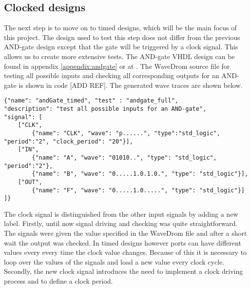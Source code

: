 \subsection{Clocked designs}
The next step is to move on to timed designs, which will be the main focus of this project. The design used to test this step does not differ from the previous AND-gate design except that the gate will be triggered by a clock signal. This allows us to create more extensive tests. The AND-gate VHDL design can be found in appendix \ref{appendix:andgate} or at \cite{examples}.
\npar
The WaveDrom source file for testing all possible inputs and checking all corresponding outputs for an AND-gate is shown in code [ADD REF]. The generated wave traces are shown below.
\begin{lstlisting}[style=json, caption={JSON source file for a full AND-gate test}, label={json:andgate_full}]
{"name": "andGate_timed", "test" : "andgate_full", 
"description": "test all possible inputs for an AND-gate", 
"signal": [
	["CLK",
		{"name": "CLK", "wave": "p......", "type":"std_logic", "period":"2", "clock_period": "20"}],
	["IN",
		{"name": "A", "wave": "01010..", "type": "std_logic", "period":"2"},
		{"name": "B", "wave": "0.....1.0.1.0.", "type": "std_logic"}],
	["OUT",
		{"name": "F", "wave": "0.....1.0.....", "type": "std_logic"}]
]}
\end{lstlisting}\noindent
{}\nline
The clock signal is distinguished from the other input signals by adding a new label.
\npar
Firstly, until now signal driving and checking was quite straightforward. The signals were given the value specified in the WaveDrom file and after a short wait the output was checked. In timed designs however ports can have different values every every time the clock value changes. Because of this it is necessary to loop over the values of the signals and load a new value every clock cycle.
\npar
Secondly, the new clock signal introduces the need to implement a clock driving process and to define a clock period. 
